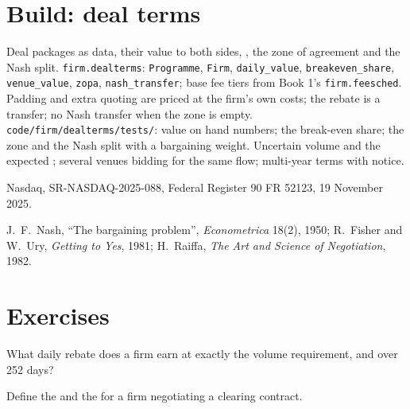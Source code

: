 \section{Build: deal terms}\label{bld:fm:commercial-relationships-with-venues-brokers-and-vendors:dealterms}

\begin{build}
 Deal packages as data, their value to both sides, , the zone of agreement and the Nash split.
 \texttt{firm.dealterms}: \texttt{Programme}, \texttt{Firm}, \texttt{daily\_value}, \texttt{breakeven\_share}, \texttt{venue\_value},
\texttt{zopa}, \texttt{nash\_transfer}; base fee tiers from Book 1's \texttt{firm.feesched}.
 Padding and extra quoting are priced at the firm's own costs; the rebate is a transfer; no Nash transfer when the zone is empty.
 \texttt{code/firm/dealterms/tests/}: value on hand numbers; the break-even share; the zone and the Nash split with a
bargaining weight.
 Uncertain volume and the expected ; several venues bidding for the same flow; multi-year terms with notice.
\end{build}

\begin{omsources}
\item Nasdaq, SR-NASDAQ-2025-088, Federal Register 90 FR 52123, 19 November 2025.
\item J.~F.~Nash, ``The bargaining problem'', \emph{Econometrica} 18(2), 1950; R.~Fisher and W.~Ury, \emph{Getting to Yes}, 1981; H.~Raiffa,
\emph{The Art and Science of Negotiation}, 1982.
\end{omsources}

\section{Exercises}

\begin{exercise}[$\star$]\label{exo:fm:commercial-relationships-with-venues-brokers-and-vendors:1}
What daily rebate does a firm earn at exactly the volume requirement, and over 252 days?
\end{exercise}

\begin{exercise}[$\star$]\label{exo:fm:commercial-relationships-with-venues-brokers-and-vendors:2}
Define the  and the  for a firm negotiating a clearing contract.
\end{exercise}

